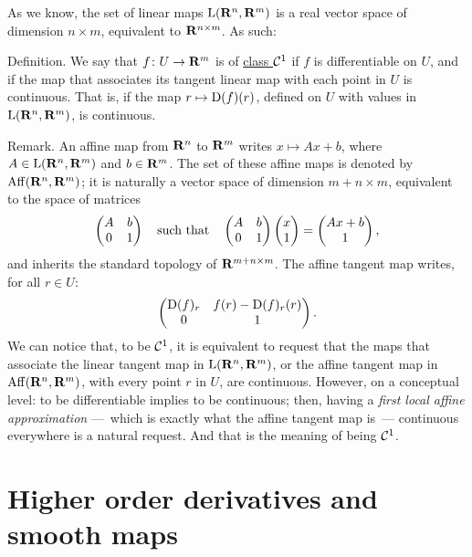 As we know,
the set of linear maps $\operatorname{L}(\mathbf{R}^n,\mathbf{R}^m)$ is a real vector space of dimension $n \times m$,
equivalent to $\mathbf{R}^{n\times m}$.
As such:

\begin{Article}{Definition.}{\itshape}
  We say that $f \colon U \to \mathbf{R}^m$ is of \underline{class ${\mathcal{C}}^{1}$} if $f$ is differentiable on $U$,
  and if the map that associates its tangent linear map with each point in $U$ is continuous.
  That is,
  if the map $r \mapsto \operatorname{D}(f)(r)$,
  defined on $U$ with values in $\operatorname{L}(\mathbf{R}^n,\mathbf{R}^m)$,
  is continuous.
\end{Article}

\begin{Article}{Remark.}{}
  An affine map from $\mathbf{R}^n$ to $\mathbf{R}^m$ writes $x \mapsto Ax + b$,
  where $A \in \operatorname{L}(\mathbf{R}^n,\mathbf{R}^m)$ and $b \in \mathbf{R}^m$.
  The set of these affine maps is denoted by $\operatorname{Aff}(\mathbf{R}^n,\mathbf{R}^m)$;
  it is naturally a vector space of dimension $m + n \times m$,
  equivalent to the space of matrices
  $$%
    \Vector{A & b \\ 0 & 1}
    \quad \text{such that} \quad
    \Vector{A & b \\ 0 & 1} \Vector{x \\ 1} = \Vector{A x + b \\ 1},
    $$%
  and inherits the standard topology of $\mathbf{R}^{m + n \times m}$.
  The affine tangent map writes, for all $r \in U$:
  $$%
    \Vector{\Der(f)_{r} & f(r) - \Der(f)_{r}(r) \\ 0 & 1}.
    $$%
  We can notice that,
  to be ${\mathcal{C}}^{1}$,
  it is equivalent to request that the maps that associate the linear tangent map in $\operatorname{L}(\mathbf{R}^n,\mathbf{R}^m)$,
  or the affine tangent map in $\operatorname{Aff}(\mathbf{R}^n,\mathbf{R}^m)$,
  with every point $r$ in $U$,
  are continuous.
  However,
  on a conceptual level:
  to be differentiable implies to be continuous;
  then,
  having a \emph{first local affine approximation}
  ---~which is exactly what the affine tangent map is~---
  continuous everywhere is a natural request.
  And that is the meaning of being ${\mathcal{C}}^{1}$.
\end{Article}


\section{Higher order derivatives and smooth maps}

